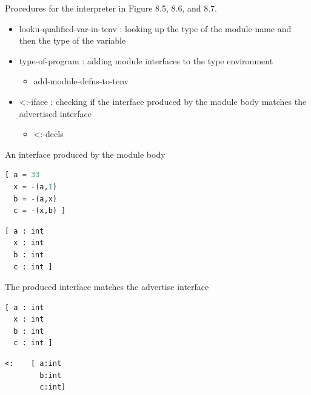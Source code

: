 \documentclass{article}
\begin{document}
\begin{huge}
Procedures for the interpreter in Figure 8.5, 8.6, and 8.7.
\begin{itemize}
\item looku-qualified-var-in-tenv : looking up the type of the module name and then the type of the variable
\item type-of-program : adding module interfaces to the type environment
\begin{itemize}
\item add-module-defns-to-tenv
\end{itemize}
\item \textless:-iface : checking if the interface produced by the module body matches the advertised interface
\begin{itemize}
\item \textless:-decls
\end{itemize}
\end{itemize}



An interface produced by the module body

\begin{minipage}[t]{.5\textwidth}
\begin{lstlisting}[language=Lisp]
[ a = 33
  x = -(a,1)
  b = -(a,x)
  c = -(x,b) ]
\end{lstlisting}   
\end{minipage}
\begin{minipage}[t]{.5\textwidth}
\begin{lstlisting}[language=Lisp]
[ a : int
  x : int
  b : int
  c : int ]
\end{lstlisting}   
\end{minipage}

The produced interface matches the advertise interface

\begin{minipage}[t]{.25\textwidth}
\begin{lstlisting}[language=Lisp]
[ a : int   
  x : int   
  b : int   
  c : int ]
\end{lstlisting}   
\end{minipage}
\begin{minipage}[t]{.5\textwidth}
\begin{lstlisting}[language=Lisp]
<:    [ a:int 
        b:int 
        c:int] 
\end{lstlisting}   
\end{minipage}


\end{huge}
\end{document}
